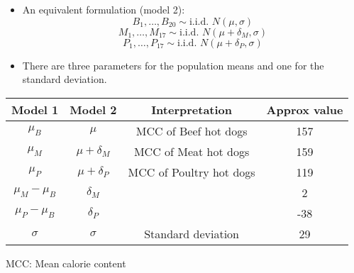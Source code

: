\begin{frame}
  \begin{itemize}
    \vspace{0.75cm}
    \item An equivalent formulation (model 2):
      $$ B_1, \dots, B_{20} \sim \text{i.i.d. } N(\mu, \sigma) $$
      $$ M_1, \dots, M_{17} \sim \text{i.i.d. } N(\mu+\delta_M, \sigma) $$
      $$ P_1, \dots, P_{17} \sim \text{i.i.d. } N(\mu+\delta_P, \sigma) $$
    \vspace{0.75cm}
    \item There are three parameters for the population means and one for the standard deviation.
  \end{itemize}
\end{frame}

\begin{frame}
  \vspace{1cm}
  \begin{table}
    \begin{tabular}{cccc}
      \hline
      \textbf{Model 1} & \textbf{Model 2} & \textbf{Interpretation} & \textbf{Approx value}\\
      \hline
      $ \mu_B $          & $ \mu $            & MCC of Beef hot dogs    & 157 \\
      $ \mu_M $          & $ \mu + \delta_M $ & MCC of Meat hot dogs    & 159 \\
      $ \mu_P $          & $ \mu + \delta_P $ & MCC of Poultry hot dogs & 119 \\
      $ \mu_M - \mu_B $  & $ \delta_M $       &                                          &   2 \\
      $ \mu_P - \mu_B $  & $ \delta_P $       &                                          & -38 \\
      $ \sigma $         & $ \sigma $         & Standard deviation                       &  29 \\
      \hline
    \end{tabular}
  \end{table}
MCC: Mean calorie content
\end{frame}

